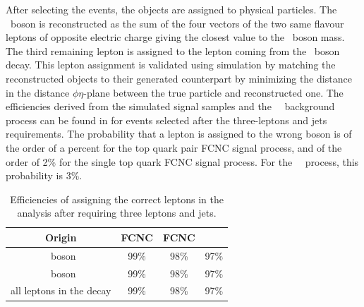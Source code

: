 %
After selecting the events,  the objects are assigned to physical particles.  The \PZ\ boson is reconstructed as the sum of the four vectors of the two same flavour leptons of opposite electric charge giving the closest value to the \PZ\ boson mass. The third remaining lepton is assigned to the lepton coming from the \PW\ boson decay. This lepton assignment is  validated using simulation by matching the reconstructed objects to their generated counterpart by minimizing  the distance in the distance $\phi\eta$-plane between the true particle and reconstructed one. The efficiencies derived from the simulated signal samples and the \SM\ \tZq\ background process can be found in  for events selected after the three-leptons and jets requirements. The probability that a lepton is assigned to the wrong boson is of the order of a percent for the top quark pair FCNC signal process, and of the order of 2\% for the single top quark FCNC signal process. For the \SM\ \tZq\ process, this probability is 3\%.
\begin{table}[htbp]
	\centering
	\caption{Efficiencies of assigning the correct leptons in the analysis after requiring three leptons and jets.}
	\begin{tabular}{cccc}
		\toprule 
		Origin & FCNC \tZq  & FCNC \tZ & \SM\ \tZq \\ 
		\midrule
		\PW\ boson & 99\% & 98\% & 97\% \\ 
	
		\PZ\ boson  & 99\% & 98\% & 97\% \B\\ 
		 \hdashline
		all leptons in the decay & 99\% & 98\% & 97\% \T \\ 
		\bottomrule
	\end{tabular} 
	\label{tab:matching}
\end{table}

